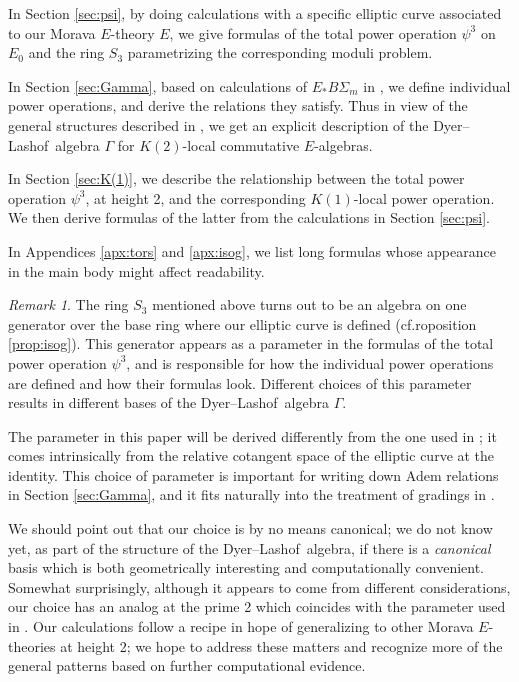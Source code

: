 \documentclass{gtpart}
\theoremstyle{definition}
\theoremstyle{remark}
\newtheorem{rmk}[thm]{Remark}
\newcommand{\DL}{Dyer--Lashof~}
\newcommand{\p}{\psi^3}
\newcommand{\G}{\Gamma}
\begin{document}
In Section \ref{sec:psi}, by doing calculations with a specific elliptic curve associated to our Morava $E$-theory $E$, 
we give formulas of the total power operation $\p$ on $E_0$ and the ring $S_3$ parametrizing the corresponding moduli problem.  

In Section \ref{sec:Gamma}, based on calculations of $E_* B\Sigma_m$ in \cite{Str98}, 
we define individual power operations, and derive the relations they satisfy.  
Thus in view of the general structures described in \cite{cong}, 
we get an explicit description of the \DL algebra $\G$ for $K(2)$-local commutative $E$-algebras.  

In Section \ref{sec:K(1)}, we describe the relationship between the total power operation $\p$, at height 2, and the corresponding $K(1)$-local power operation.  
We then derive formulas of the latter from the calculations in Section \ref{sec:psi}.  

In Appendices \ref{apx:tors} and \ref{apx:isog}, we list long formulas whose appearance in the main body might affect readability.  

\begin{rmk}
 The ring $S_3$ mentioned above turns out to be an algebra on one generator over the base ring where our elliptic curve is defined 
 (cf.roposition \ref{prop:isog}).  This generator appears as a parameter in the formulas of the total power operation $\p$, 
 and is responsible for how the individual power operations are defined and how their formulas look.  
 Different choices of this parameter results in different bases of the \DL algebra $\G$.  

 The parameter in this paper will be derived differently from the one used in \cite{h2p2}; 
 it comes intrinsically from the relative cotangent space of the elliptic curve at the identity.  
 This choice of parameter is important for writing down Adem relations in Section \ref{sec:Gamma}, 
 and it fits naturally into the treatment of gradings in \cite{cong}.  

 We should point out that our choice is by no means canonical; 
 we do not know yet, as part of the structure of the \DL algebra, 
 if there is a {\em canonical} basis which is both geometrically interesting and computationally convenient.  
 Somewhat surprisingly, although it appears to come from different considerations, 
 our choice has an analog at the prime 2 which coincides with the parameter used in \cite{h2p2}.  
 Our calculations follow a recipe in hope of generalizing to other Morava $E$-theories at height 2; 
 we hope to address these matters and recognize more of the general patterns based on further computational evidence.  
\end{rmk}
\end{document}
